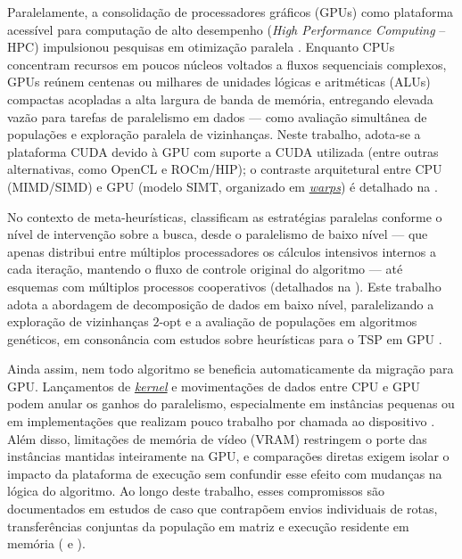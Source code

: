Paralelamente, a consolidação de processadores gráficos (GPUs) como plataforma acessível para computação de alto desempenho (\emph{High Performance Computing} -- HPC) impulsionou pesquisas em otimização paralela \autocite{nvidia2024cuda}.
Enquanto CPUs concentram recursos em poucos núcleos voltados a fluxos sequenciais complexos, GPUs reúnem centenas ou milhares de unidades lógicas e aritméticas (ALUs) compactas acopladas a alta largura de banda de memória, entregando elevada vazão para tarefas de paralelismo em dados --- como avaliação simultânea de populações e exploração paralela de vizinhanças.
Neste trabalho, adota-se a plataforma CUDA devido à GPU com suporte a CUDA utilizada (entre outras alternativas, como OpenCL e ROCm/HIP); o contraste arquitetural entre CPU (MIMD/SIMD) e GPU (modelo SIMT, organizado em \hyperlink{term:warp}{\emph{warps}}) é detalhado na .

No contexto de meta-heurísticas, \textcite{crainic2003parallel} classificam as estratégias paralelas conforme o nível de intervenção sobre a busca, desde o paralelismo de baixo nível — que apenas distribui entre múltiplos processadores os cálculos intensivos internos a cada iteração, mantendo o fluxo de controle original do algoritmo — até esquemas com múltiplos processos cooperativos (detalhados na ).
Este trabalho adota a abordagem de decomposição de dados em baixo nível, paralelizando a exploração de vizinhanças \(2\)-opt e a avaliação de populações em algoritmos genéticos, em consonância com estudos sobre heurísticas para o TSP em GPU \autocite{schulz2013gpu,tsp_gpu,fujimoto2011highly}.

Ainda assim, nem todo algoritmo se beneficia automaticamente da migração para GPU.
Lançamentos de \hyperlink{term:kernel}{\emph{kernel}} e movimentações de dados entre CPU e GPU podem anular os ganhos do paralelismo, especialmente em instâncias pequenas ou em implementações que realizam pouco trabalho por chamada ao dispositivo \autocite{van2013gpu,luong2013gpu}.
Além disso, limitações de memória de vídeo (VRAM) restringem o porte das instâncias mantidas inteiramente na GPU, e comparações diretas exigem isolar o impacto da plataforma de execução sem confundir esse efeito com mudanças na lógica do algoritmo.
Ao longo deste trabalho, esses compromissos são documentados em estudos de caso que contrapõem envios individuais de rotas, transferências conjuntas da população em matriz e execução residente em memória ( e ).

